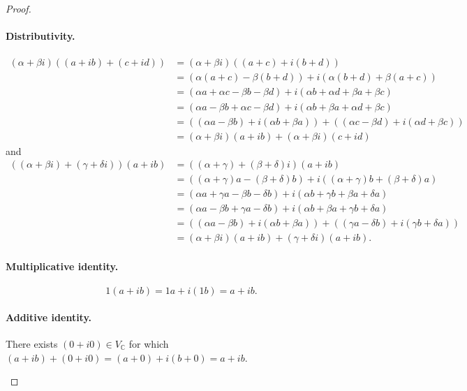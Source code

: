 \documentclass{exam}
\begin{document}
\begin{proof}
    \paragraph{Distributivity.}
    \begin{align*}
        (\alpha + \beta i)((a + ib) + (c + id)) &= (\alpha + \beta i)((a + c) + i(b + d))\\
        &= (\alpha(a + c) - \beta(b + d)) + i(\alpha(b+d) + \beta(a + c))\\
        &=(\alpha a + \alpha c - \beta b - \beta d) + i(\alpha b + \alpha d + \beta a + \beta c)\\
        &=(\alpha a -\beta b + \alpha c - \beta d) + i(\alpha b + \beta a + \alpha d + \beta c)\\
        &= ((\alpha a - \beta b) + i(\alpha b + \beta a)) + ((\alpha c - \beta d) + i(\alpha d + \beta c))\\
        &= (\alpha + \beta i)(a + ib) + (\alpha + \beta i)(c + id)
    \end{align*}
    and
    \begin{align*}
        ((\alpha + \beta i) + (\gamma + \delta i))(a + ib) &= ((\alpha + \gamma) + (\beta + \delta)i)(a + ib)\\
        &= ((\alpha + \gamma)a - (\beta + \delta)b) + i((\alpha + \gamma)b + (\beta + \delta)a)\\
        &= (\alpha a + \gamma a - \beta b - \delta b) + i(\alpha b + \gamma b + \beta a + \delta a)\\
        &= (\alpha a - \beta b + \gamma a - \delta b) + i(\alpha b + \beta a + \gamma b + \delta a)\\
        &= ((\alpha a - \beta b) + i(\alpha b + \beta a)) + ((\gamma a - \delta b) + i(\gamma b + \delta a))\\
        &= (\alpha + \beta i)(a + ib) + (\gamma + \delta i)(a + ib).
    \end{align*}

    \paragraph{Multiplicative identity.} $$1(a + ib) = 1a + i(1b) = a + ib.$$
    
    \paragraph{Additive identity.}
    \begin{center}
        There exists $(0 + i0)\in V_{\mathbb C}$ for which $(a + ib) + (0 + i0) = (a + 0) + i(b + 0) = a + ib$.
    \end{center}


\end{proof}
\end{document}
